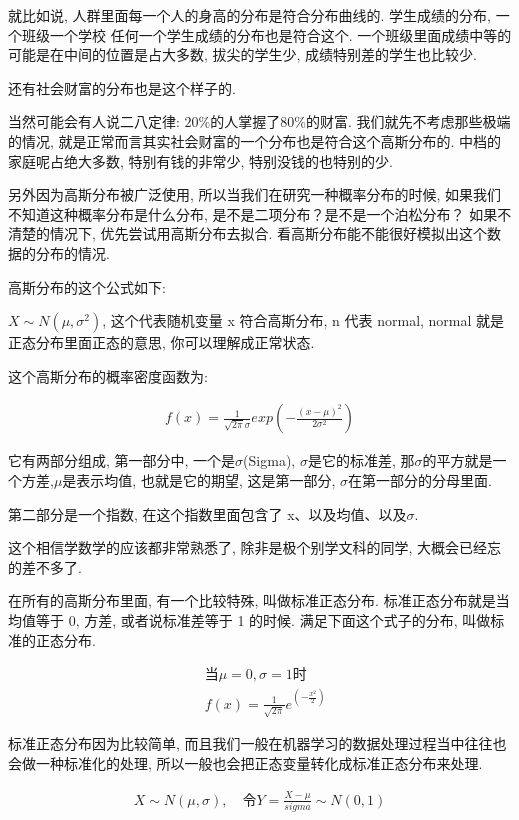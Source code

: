 就比如说, 人群里面每一个人的身高的分布是符合分布曲线的. 学生成绩的分布, 一个班级一个学校
任何一个学生成绩的分布也是符合这个. 一个班级里面成绩中等的可能是在中间的位置是占大多数, 拔尖的学生少, 成绩特别差的学生也比较少. 

还有社会财富的分布也是这个样子的. 

当然可能会有人说二八定律: $20\%$的人掌握了$80\%$的财富. 我们就先不考虑那些极端的情况, 就是正常而言其实社会财富的一个分布也是符合这个高斯分布的. 中档的家庭呢占绝大多数, 特别有钱的非常少, 特别没钱的也特别的少. 

另外因为高斯分布被广泛使用, 所以当我们在研究一种概率分布的时候, 如果我们不知道这种概率分布是什么分布, 是不是二项分布？是不是一个泊松分布？ 如果不清楚的情况下, 优先尝试用高斯分布去拟合. 看高斯分布能不能很好模拟出这个数据的分布的情况. 

高斯分布的这个公式如下: 

$X \sim N(\mu,\sigma ^2)$,  这个代表随机变量 x 符合高斯分布, n 代表 normal, normal 就是正态分布里面正态的意思, 你可以理解成正常状态. 

这个高斯分布的概率密度函数为: 

\begin{align*}
  f(x)  = \frac{1}{\sqrt {2\pi}\sigma}exp(-\frac{(x-\mu)^2}{2\sigma^2})
\end{align*}

它有两部分组成, 第一部分中, 一个是$\sigma$(Sigma), $\sigma$是它的标准差, 那$\sigma$的平方就是一个方差,$\mu$是表示均值, 也就是它的期望, 这是第一部分, $\sigma$在第一部分的分母里面. 

第二部分是一个指数, 在这个指数里面包含了 x、以及均值、以及$\sigma$. 

这个相信学数学的应该都非常熟悉了, 除非是极个别学文科的同学, 大概会已经忘的差不多了. 

在所有的高斯分布里面, 有一个比较特殊, 叫做标准正态分布. 标准正态分布就是当均值等于 0, 方差, 或者说标准差等于 1 的时候. 满足下面这个式子的分布, 叫做标准的正态分布. 

\begin{align*}
  & \mbox{当}\mu = 0, \sigma = 1 \mbox{时} \\
  & f(x) = \frac{1}{\sqrt {2\pi}} e^{(-\frac{x^2}{2})}
\end{align*}

标准正态分布因为比较简单, 而且我们一般在机器学习的数据处理过程当中往往也会做一种标准化的处理, 所以一般也会把正态变量转化成标准正态分布来处理. 

\begin{align*}
  X \sim N(\mu, \sigma), \quad \mbox{令}Y= \frac{X-\mu}{sigma} \sim N(0,1)
\end{align*}

